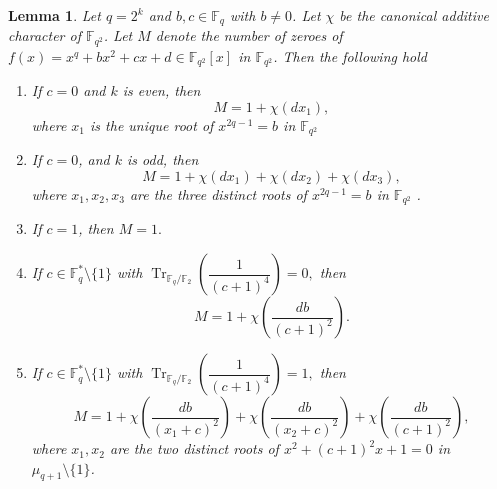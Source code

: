 \documentclass[12pt]{amsart}
\newtheorem{lemma}[theorem]{Lemma}
\theoremstyle{definition}
\theoremstyle{remark}
\numberwithin{equation}{section}
\begin{document}
\begin{lemma}\label{l3.3}
Let $q=2^k$ and $b,c \in \mathbb{F}_q$ with $b \neq 0$. Let $\chi$ be the canonical additive character of $\mathbb{F}_{q^2}$. Let $M$ denote the number of zeroes of 
$
f(x)=x^q+bx^2+cx+d \in \mathbb{F}_{q^2}[x]
$ in $\mathbb{F}_{q^2}$. Then the following hold


\begin{enumerate}
\item If $c=0$ and $k$ is even, then
$$
M=1+\chi(dx_1),
$$
where $x_1$ is the unique root of 
$
x^{2q-1}=b
$ 
in $\mathbb{F}_{q^2}$ 

\item If $c=0$, and $k$ is odd, then
$$
M
=
1+\chi(dx_1)+\chi(dx_2)+\chi(dx_3),
$$
where $x_1,x_2,x_3$ are the three distinct roots of $x^{2q-1}=b$ in $\mathbb{F}_{q^2}$ .
\item If $c=1$, then
$
M=1.
$

\item If $c \in \mathbb{F}_q^* \setminus \{1\}$ with
$
\operatorname{Tr}_{\mathbb{F}_q/\mathbb{F}_2}\!\left(\dfrac{1}{(c+1)^4}\right)=0,
$
then
$$
M=1+\chi\!\left(\dfrac{db}{(c+1)^2}\right).
$$

\item If $c \in \mathbb{F}_q^* \setminus \{1\}$ with
$
\operatorname{Tr}_{\mathbb{F}_q/\mathbb{F}_2}\!\left(\dfrac{1}{(c+1)^4}\right)=1,
$
then
$$
M
=
1
+
\chi\!\left(\frac{db}{(x_1+c)^2}\right)
+
\chi\!\left(\frac{db}{(x_2+c)^2}\right)
+
\chi\!\left(\frac{db}{(c+1)^2}\right),
$$
where $x_1,x_2$ are the two distinct roots of
$
x^2+(c+1)^2x+1=0
$ in $\mu_{q+1}\setminus\{1\}$.


\end{enumerate}
\end{lemma}
\end{document}
